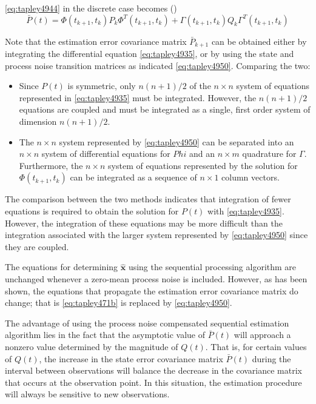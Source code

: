 \ref{eq:tapley4944} in the discrete case becomes (\cite{tapley})
\begin{equation}
	\label{eq:tapley4950}
	\bar{P}(t) = \Phi (t_{k+1} , t_k ) P_k \Phi ^T (t_{k+1} , t_k )
	+ \Gamma (t_{k+1}, t_k ) Q_k \Gamma ^T (t_{k+1}, t_k )
\end{equation}

Note that the estimation error covariance matrix \(\bar{P}_{k+1}\) can be obtained
either by integrating the differential equation \ref{eq:tapley4935}, or by using the
state and process noise transition matrices as indicated \ref{eq:tapley4950}. Comparing
the two:
\begin{itemize}
	\item Since \(P(t)\) is symmetric, only \( n (n+1) / 2 \) of the \( n \times n\)
	      system of equations represented in \ref{eq:tapley4935} must be integrated. However,
	      the \( n (n+1) / 2 \) equations are coupled and must be integrated as a single,
	      first order system of dimension \( n (n+1) / 2 \).
	\item The \(n \times n\) system represented by \ref{eq:tapley4950} can be separated
	      into an \( n \times n\) system of differential equations for \(Phi\) and an
	      \( n \times m\) quadrature for \(\Gamma\). Furthermore, the \(n \times n\) system
	      of equations represented by the solution for \(\Phi (t_{k+1} , t_k )\) can be integrated
	      as a sequence of \(n \times 1\) column vectors.
\end{itemize}

The comparison between the two methods indicates that integration of fewer
equations is required to obtain the solution for \(P(t)\) with \ref{eq:tapley4935}.
However, the integration of these equations may be more difficult than the integration
associated with the larger system represented by \ref{eq:tapley4950} since they are 
coupled.

The equations for determining \(\hat{\bm{x}}\) using the sequential processing algorithm are 
unchanged whenever a zero-mean process noise is included. However, as has been 
shown, the equations that propagate the estimation error covariance matrix do change; 
that is \ref{eq:tapley471b} is replaced by \ref{eq:tapley4950}.

The advantage of using the process noise compensated sequential estimation algorithm 
lies in the fact that the asymptotic value of \(\bar{P}(t)\) will approach a nonzero 
value determined by the magnitude of \(Q(t)\). That is, for certain values of \(Q(t)\), 
the increase in the state error covariance matrix \(\bar{P}(t)\) during the interval between 
observations will balance the decrease in the covariance matrix that occurs at the 
observation point. In this situation, the estimation procedure will always be sensitive 
to new observations.

